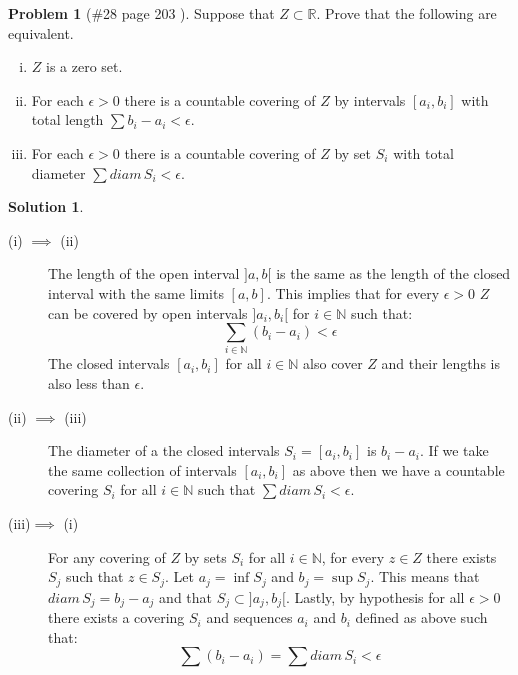 \documentclass{article}
\theoremstyle{definition}
\newtheorem*{soln}{Solution}
\newtheorem*{prob}{Problem}
\theoremstyle{theorem}
\newcommand{\R}{\mathbb{R}}
\newcommand{\N}{\mathbb{N}}
\begin{document}
\begin{prob}[\#28 page 203   ]
    Suppose that $Z\subset \R$. Prove that the following are equivalent.
    \begin{enumerate}[(i)]
        \item $Z$ is a zero set.
        \item For each $\epsilon>0$ there is a countable covering of $Z$ by intervals $[a_i, b_i]$ with total length $\sum b_i - a_i <\epsilon$.
        \item For each $\epsilon>0$ there is a countable covering of $Z$ by set $S_i$ with total diameter $\sum diam\, S_i <\epsilon$.

    \end{enumerate}
\end{prob}
\begin{soln}
\begin{description}
    \item[(i) $\implies$ (ii)] The length of the open interval $]a,b[$ is the same as the length of the closed interval with the same limits $[a,b]$. This implies that for every $\epsilon >0$ $Z$ can be covered by open intervals $]a_i,b_i[$ for $i\in \N$ such that:
        $$\sum_{i\in \N }(b_i-a_i)<\epsilon $$
        The closed intervals $[a_i,b_i]$ for all $i\in \N$ also cover $Z$ and their lengths is also less than $\epsilon$.
    \item[(ii) $\implies$ (iii)] The diameter of a the closed intervals $S_i = [a_i, b_i]$ is $b_i -a_i$. If we take the same collection of intervals $[a_i,b_i]$ as above then we have a countable covering $S_i$ for all $i\in \N$ such that $\sum diam\, S_i <\epsilon$.
    \item[(iii)$\implies$ (i)] For any covering of $Z$ by sets $S_i$ for all $i\in \N$, for every $z\in Z$ there exists $S_j$ such that $z\in S_j$.  Let $a_j= \inf S_j$ and $b_j = \sup S_j$. This means that $diam \, S_j = b_j-a_j$ and that $S_j \subset ]a_j, b_j[$. Lastly, by hypothesis for all $\epsilon >0$  there exists a covering $S_i$  and sequences $a_i$ and $b_i$ defined as above such that:
        $$\sum (b_i - a_i) = \sum diam\, S_i < \epsilon$$
\end{description}
\end{soln}
\vspace{1in}
\end{document}
